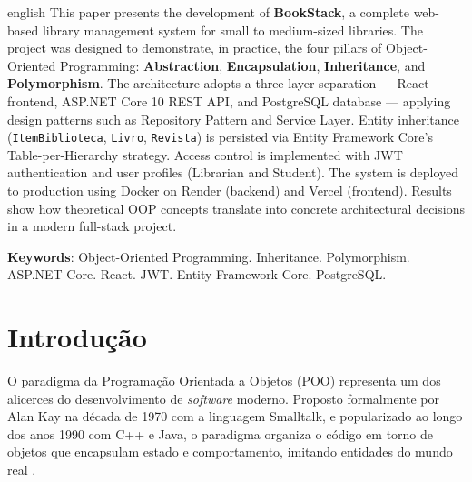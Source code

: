 \documentclass[
  12pt,
  a4paper,
  oneside,
  brazil
]{abntex2}
\begin{document}
\begin{resumo}[Abstract]
\begin{otherlanguage*}{english}
This paper presents the development of \textbf{BookStack}, a complete web-based library management system for small to medium-sized libraries. The project was designed to demonstrate, in practice, the four pillars of Object-Oriented Programming: \textbf{Abstraction}, \textbf{Encapsulation}, \textbf{Inheritance}, and \textbf{Polymorphism}. The architecture adopts a three-layer separation — React frontend, ASP.NET Core 10 REST API, and PostgreSQL database — applying design patterns such as Repository Pattern and Service Layer. Entity inheritance (\texttt{ItemBiblioteca}, \texttt{Livro}, \texttt{Revista}) is persisted via Entity Framework Core's Table-per-Hierarchy strategy. Access control is implemented with JWT authentication and user profiles (Librarian and Student). The system is deployed to production using Docker on Render (backend) and Vercel (frontend). Results show how theoretical OOP concepts translate into concrete architectural decisions in a modern full-stack project.

\vspace{\onelineskip}

\noindent\textbf{Keywords}: Object-Oriented Programming. Inheritance. Polymorphism. ASP.NET Core. React. JWT. Entity Framework Core. PostgreSQL.
\end{otherlanguage*}
\end{resumo}

\tableofcontents*
\cleardoublepage

\listoftables
\cleardoublepage

\textual

\chapter{Introdução}

O paradigma da Programação Orientada a Objetos (POO) representa um dos alicerces do desenvolvimento de \textit{software} moderno. Proposto formalmente por Alan Kay na década de 1970 com a linguagem Smalltalk, e popularizado ao longo dos anos 1990 com C++ e Java, o paradigma organiza o código em torno de objetos que encapsulam estado e comportamento, imitando entidades do mundo real \cite{booch1994}.
\end{document}
